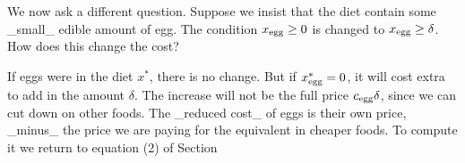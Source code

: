 We now ask a different question. Suppose we insist that the diet contain some _small_ edible amount of egg. The condition \(x_{\rm egg}\geq 0\) is changed to \(x_{\rm egg}\geq\delta\). How does this change the cost?

If eggs were in the diet \(x^{*}\), there is no change. But if \(x^{*}_{\rm egg}=0\), it will cost extra to add in the amount \(\delta\). The increase will not be the full price \(c_{\rm egg}\delta\), since we can cut down on other foods. The _reduced cost_ of eggs is their own price, _minus_ the price we are paying for the equivalent in cheaper foods. To compute it we return to equation (2) of Section